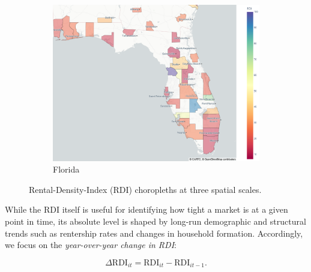 \documentclass[APA,Times1COL]{WileyNJDv5} %
\begin{document}
\begin{figure}[hbt!]
\begin{subfigure}[b]{0.32\textwidth}
		\includegraphics[width=\linewidth]{florida.png}
		\caption{Florida}\label{fig:florida_choropleth}
	\end{subfigure}
	
	\caption{Rental-Density-Index (RDI) choropleths at three spatial scales.}
	\label{fig:choropleth_panel}
\end{figure}


While the RDI itself is useful for identifying how tight a market is at a given point in time, its absolute level is shaped by long-run demographic and structural trends such as rentership rates and changes in household formation. Accordingly, we focus on the \textit{year-over-year change in RDI}:

\begin{equation*}
	\Delta \text{RDI}_{it} = \text{RDI}_{it} - \text{RDI}_{it-1}.
\end{equation*}
\end{document}
